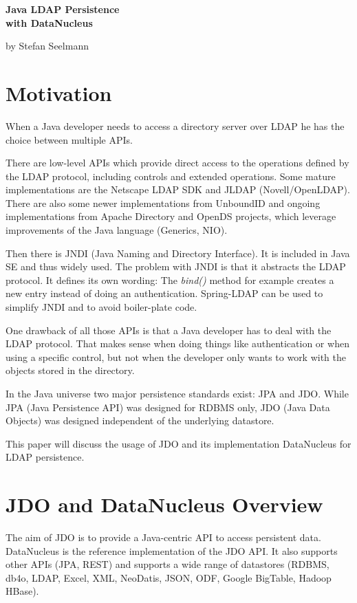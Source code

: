 \documentclass[a4paper,11pt,oneside]{article}
\begin{document}
\thispagestyle{empty}
\begin{Huge}
\noindent
\textbf{Java LDAP Persistence} \\ [0.2cm]
\textbf{with DataNucleus} \\
\end{Huge}

by Stefan Seelmann \\

\section{Motivation}

When a Java developer needs to access a directory server over LDAP he has the choice between multiple APIs. 

There are low-level APIs which provide direct access to the operations defined by the LDAP protocol, including controls and extended operations. Some mature implementations are the Netscape LDAP SDK and JLDAP (Novell/OpenLDAP). There are also some newer implementations from UnboundID and ongoing implementations from Apache Directory and OpenDS projects, which leverage improvements of the Java language (Generics, NIO).

Then there is JNDI (Java Naming and Directory Interface). It is included in Java SE and thus widely used. The problem with JNDI is that it abstracts the LDAP protocol. It defines its own wording: The \textit{bind()} method for example creates a new entry instead of doing an authentication. Spring-LDAP can be used to simplify JNDI and to avoid boiler-plate code.

One drawback of all those APIs is that a Java developer has to deal with the LDAP protocol. That makes sense when doing things like authentication or when using a specific control, but not when the developer only wants to work with the objects stored in the directory.

In the Java universe two major persistence standards exist: JPA and JDO. While JPA (Java Persistence API) was designed for RDBMS only, JDO (Java Data Objects) was designed independent of the underlying datastore.

This paper will discuss the usage of JDO and its implementation DataNucleus for LDAP persistence.


\section{JDO and DataNucleus Overview}
The aim of JDO is to provide a Java-centric API to access persistent data. DataNucleus is the reference implementation of the JDO API. It also supports other APIs (JPA, REST) and supports a wide range of datastores (RDBMS, db4o, LDAP, Excel, XML, NeoDatis, JSON, ODF, Google BigTable, Hadoop HBase).
\end{document}
